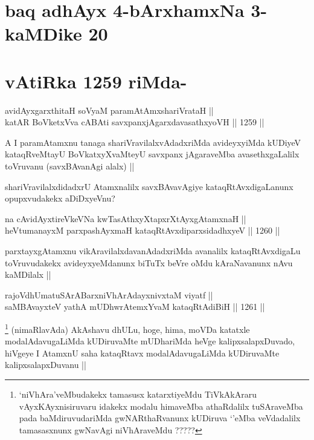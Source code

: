 \section*{baq adhAyx 4-bArxhamxNa 3- kaMDike 20}

\section*{vAtiRka 1259 riMda-}


\begin{shl}
avidAyxgarxthitaH soV\s yaM paramAtAmx\s shariVrataH || \\
katAR BoVketxVva cA\s \s BAti savxpanxjAgarxdavasathxyoVH ||  1259 ||  
\end{shl}

\begin{artha}
A I paramAtamxnu tanaga shariVravilalxvAdadxriMda avideyxyiMda kUDiyeV kataqRveMtayU BoVkatxyXvaMteyU savxpanx jAgaraveMba avasethxgaLalilx toVruvanu (savxBAvanAgi alalx) ||
\end{artha}

\begin{artha}
shariVravilalxdidadxrU Atamxnalilx savxBAvavAgiye kataqRtAvxdigaLanunx opupxvudakekx aDiDxyeVnu?
\end{artha}

\begin{shl}
na cAvidAyxtireVkeVNa kwTasAthxyXtapxrXtAyxgAtamxnaH || \\
heVtumanayxM parxpashAyxmaH kataqRtAvxdiparxsidadhxyeV ||  1260 ||  
\end{shl}

\begin{artha}
parxtayxgAtamxnu vikAravilalxdavanAdadxriMda avanalilx kataqRtAvxdigaLu toVruvudakekx avideyxyeMdanunx biTuTx beVre oMdu kAraNavanunx nAvu kaMDilalx ||
\end{artha}


\begin{shl}
rajoVdhUmatuSArABarxniVhArAdayxnivxtaM viyatf || \\
saMBAvayxteV yathA mUDhwrAtemxYvaM kataqRtAdiBiH ||  1261 ||  
\end{shl}	

\begin{artha}
\footnote{`niVhAra'veMbudakekx tamasusx katarxtiyeMdu TiVkAkAraru vAyxKAyxnisiruvaru idakekx modalu himaveMba athaRdalilx tuSAraveMba pada baMdiruvudariMda gwNARthaRvanunx kUDiruva `\stext'eMba veVdadalilx tamasasxnunx gwNavAgi niVhAraveMdu ?????}
(nimaRlavAda) AkAshavu dhULu, hoge, hima, moVDa katatxle modalAdavugaLiMda kUDiruvaMte mUDhariMda heVge kalipxsalapxDuvado, hiVgeye I AtamxnU saha kataqRtavx modalAdavugaLiMda kUDiruvaMte kalipxsalapxDuvanu ||
\end{artha}

